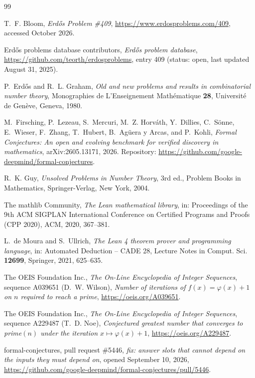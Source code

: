\documentclass[11pt]{amsart}
\theoremstyle{plain}
\theoremstyle{definition}
\begin{document}
\begin{thebibliography}{99}

T.~F. Bloom, \emph{Erd\H{o}s Problem \#409}, \url{https://www.erdosproblems.com/409}, accessed October 2026.

Erd\H{o}s problems database contributors, \emph{Erd\H{o}s problem database}, \url{https://github.com/teorth/erdosproblems}, entry 409 (status: open, last updated August 31, 2025).

P.~Erd\H{o}s and R.~L. Graham, \emph{Old and new problems and results in combinatorial number theory}, Monographies de L'Enseignement Math\'ematique \textbf{28}, Universit\'e de Gen\`eve, Geneva, 1980.

M.~Firsching, P.~Lezeau, S.~Mercuri, M.~Z. Horv\'ath, Y.~Dillies, C.~S\"onne, E.~Wieser, F.~Zhang, T.~Hubert, B.~Ag\"uera y Arcas, and P.~Kohli, \emph{Formal Conjectures: An open and evolving benchmark for verified discovery in mathematics}, arXiv:2605.13171, 2026. Repository: \url{https://github.com/google-deepmind/formal-conjectures}.

R.~K. Guy, \emph{Unsolved Problems in Number Theory}, 3rd ed., Problem Books in Mathematics, Springer-Verlag, New York, 2004.

The mathlib Community, \emph{The Lean mathematical library}, in: Proceedings of the 9th ACM SIGPLAN International Conference on Certified Programs and Proofs (CPP 2020), ACM, 2020, 367--381.

L.~de Moura and S.~Ullrich, \emph{The Lean 4 theorem prover and programming language}, in: Automated Deduction -- CADE 28, Lecture Notes in Comput. Sci. \textbf{12699}, Springer, 2021, 625--635.

The OEIS Foundation Inc., \emph{The On-Line Encyclopedia of Integer Sequences}, sequence A039651 (D.~W. Wilson), \emph{Number of iterations of $f(x)=\varphi(x)+1$ on $n$ required to reach a prime}, \url{https://oeis.org/A039651}.

The OEIS Foundation Inc., \emph{The On-Line Encyclopedia of Integer Sequences}, sequence A229487 (T.~D. Noe), \emph{Conjectured greatest number that converges to prime$(n)$ under the iteration $x\mapsto\varphi(x)+1$}, \url{https://oeis.org/A229487}.

formal-conjectures, pull request \#5446, \emph{fix: answer slots that cannot depend on the inputs they must depend on}, opened September 10, 2026, \url{https://github.com/google-deepmind/formal-conjectures/pull/5446}.

\end{thebibliography}
\end{document}
